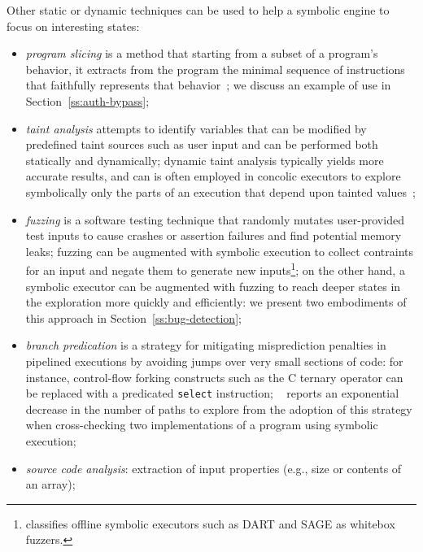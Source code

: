 Other static or dynamic techniques can be used to help a symbolic engine to focus on interesting states:
\begin{itemize}
  \item {\em program slicing} is a method that starting from a subset of a program's behavior, it extracts from the program the minimal sequence of instructions that faithfully represents that behavior~\cite{Weiser84}; we discuss an example of use in Section~\ref{ss:auth-bypass}; 
  \item {\em taint analysis}  attempts to identify variables that can be modified by predefined taint sources such as user input and can be performed both statically and dynamically; dynamic taint analysis typically yields more accurate results, and can is often employed in concolic executors to explore symbolically only the parts of an execution that depend upon tainted values~\cite{SAB-SP10};
  \item {\em fuzzing} is a software testing technique that randomly mutates user-provided test inputs to cause crashes or assertion failures and find potential memory leaks; fuzzing can be augmented with symbolic execution to collect contraints for an input and negate them to generate new inputs\footnote{\cite{DRILLER-NDSS16} classifies offline symbolic executors such as {\sc DART} and {\sc SAGE} as whitebox fuzzers.}; on the other hand, a symbolic executor can be augmented with fuzzing to reach deeper states in the exploration more quickly and efficiently: we present two embodiments of this approach in Section~\ref{ss:bug-detection}; 
  \item {\em branch predication} is a strategy for mitigating misprediction penalties in pipelined executions by avoiding jumps over very small sections of code: for instance, control-flow forking constructs such as the C ternary operator can be replaced with a predicated {\tt select} instruction; ~\cite{CCK-EUROSYS11} reports an exponential decrease in the number of paths to explore from the adoption of this strategy when cross-checking two implementations of a program using symbolic execution;  %
  \item {\em source code analysis}:  extraction of input properties (e.g., size or contents of an array);

\end{itemize}
